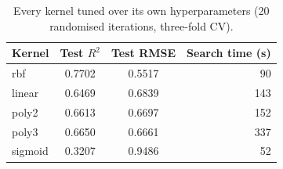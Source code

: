 \begin{table}[htbp]
\centering
\caption{Every kernel tuned over its own hyperparameters (20 randomised iterations, three-fold CV).}\label{tab:kernels}
\small
\begin{tabular}{lccr}
\toprule
Kernel & Test $R^2$ & Test RMSE & Search time (s) \\
\midrule
rbf & 0.7702 & 0.5517 & 90 \\
linear & 0.6469 & 0.6839 & 143 \\
poly2 & 0.6613 & 0.6697 & 152 \\
poly3 & 0.6650 & 0.6661 & 337 \\
sigmoid & 0.3207 & 0.9486 & 52 \\
\bottomrule
\end{tabular}
\end{table}